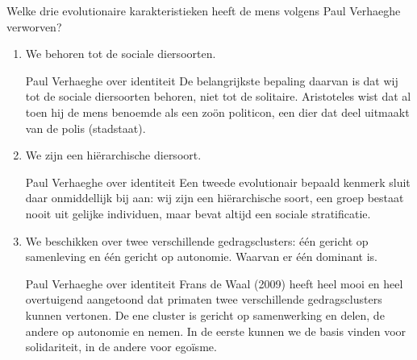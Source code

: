 \documentclass[main.tex]{subfiles}
\begin{document}
\begin{examenvraag}
    \begin{vraag}
        Welke drie evolutionaire karakteristieken heeft de mens volgens Paul Verhaeghe verworven?
    \end{vraag}

    \begin{antwoord}
        \begin{enumerate}
            \item We behoren tot de sociale diersoorten.
                \begin{citaat}{Paul Verhaeghe over identiteit}
                    De belangrijkste bepaling daarvan is dat wij tot de sociale diersoorten behoren, niet tot de solitaire.
                    Aristoteles wist dat al toen hij de mens benoemde als een zoön politicon, een dier dat deel uitmaakt van de polis (stadstaat).
                \end{citaat}
            \item We zijn een hiërarchische diersoort.
                \begin{citaat}{Paul Verhaeghe over identiteit}
                    Een tweede evolutionair bepaald kenmerk sluit daar onmiddellijk bij aan: wij zijn een hiërarchische soort, een groep bestaat nooit uit gelijke individuen, maar bevat altijd een sociale stratificatie.
                \end{citaat}
            \item We beschikken over twee verschillende gedragsclusters: \'e\'en gericht op samenleving en \'e\'en gericht op autonomie. Waarvan er \'e\'en dominant is.
                \begin{citaat}{Paul Verhaeghe over identiteit}
                    Frans de Waal (2009) heeft heel mooi en heel overtuigend aangetoond dat primaten twee verschillende gedragsclusters kunnen vertonen.
                    De ene cluster is gericht op samenwerking en delen, de andere op autonomie en nemen.
                    In de eerste kunnen we de basis vinden voor solidariteit, in de andere voor egoïsme.
                \end{citaat}
        \end{enumerate}

    \end{antwoord}
\end{examenvraag}
\end{document}
